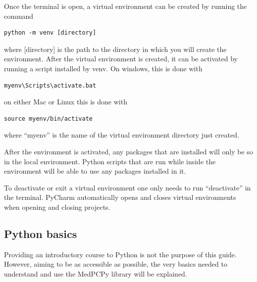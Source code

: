 \documentclass[a4paper,12pt]{article}
\begin{document}
Once the terminal is open, a virtual environment can be created by running the command
\begin{tcolorbox}[
    enhanced,
    attach boxed title to top left={xshift=6mm,yshift=-3mm},
    colback=lightgreen!20,
    colframe=lightgreen,
    colbacktitle=lightgreen,
    sharp corners,
    ]
    \begin{verbatim}
python -m venv [directory]
    \end{verbatim}
\end{tcolorbox}
\noindent where [directory] is the path to the directory in which you will create the environment. After the virtual environment is created, it can be activated by running a script installed by venv. On windows, this is done with
\begin{tcolorbox}[
    enhanced,
    attach boxed title to top left={xshift=6mm,yshift=-3mm},
    colback=lightgreen!20,
    colframe=lightgreen,
    colbacktitle=lightgreen,
    sharp corners,
    ]
    \begin{verbatim}
myenv\Scripts\activate.bat
    \end{verbatim}
\end{tcolorbox}
\noindent on either Mac or Linux this is done with
\begin{tcolorbox}[
    enhanced,
    attach boxed title to top left={xshift=6mm,yshift=-3mm},
    colback=lightgreen!20,
    colframe=lightgreen,
    colbacktitle=lightgreen,
    sharp corners,
    ]
    \begin{verbatim}
source myenv/bin/activate
    \end{verbatim}
\end{tcolorbox}
\noindent where ``myenv'' is the name of the virtual environment directory just created.

After the environment is activated, any packages that are installed will only be so in the local environment. Python scripts that are run while inside the environment will be able to use any packages installed in it.

To deactivate or exit a virtual environment one only needs to run ``deactivate'' in the terminal. PyCharm automatically opens and closes virtual environments when opening and closing projects.

\subsection{Python basics}

Providing an introductory course to Python is not the purpose of this guide. However, aiming to be as accessible as possible, the very basics needed to understand and use the MedPCPy library will be explained.
\end{document}
